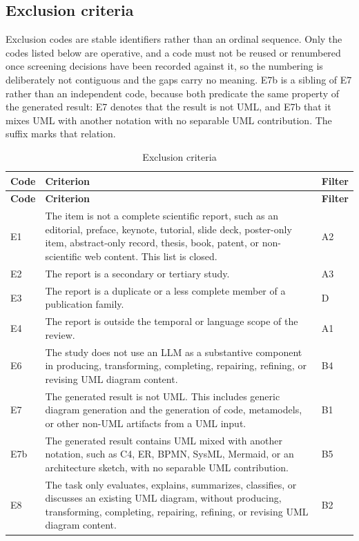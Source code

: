 \subsection{Exclusion criteria}

Exclusion codes are stable identifiers rather than an ordinal sequence. Only the codes listed below are operative, and a code must not be reused or renumbered once screening decisions have been recorded against it, so the numbering is deliberately not contiguous and the gaps carry no meaning. E7b is a sibling of E7 rather than an independent code, because both predicate the same property of the generated result: E7 denotes that the result is not UML, and E7b that it mixes UML with another notation with no separable UML contribution. The suffix marks that relation.

\begin{longtable}{p{} p{} p{}}
\caption{Exclusion criteria}
\label{tab:protocol_exclusion}\\
\toprule
\textbf{Code} & \textbf{Criterion} & \textbf{Filter} \\
\midrule
\endfirsthead
\toprule
\textbf{Code} & \textbf{Criterion} & \textbf{Filter} \\
\midrule
\endhead
E1 & The item is not a complete scientific report, such as an editorial, preface, keynote, tutorial, slide deck, poster-only item, abstract-only record, thesis, book, patent, or non-scientific web content. This list is closed. & A2 \\
E2 & The report is a secondary or tertiary study. & A3 \\
E3 & The report is a duplicate or a less complete member of a publication family. & D \\
E4 & The report is outside the temporal or language scope of the review. & A1 \\
E6 & The study does not use an LLM as a substantive component in producing, transforming, completing, repairing, refining, or revising UML diagram content. & B4 \\
E7 & The generated result is not UML. This includes generic diagram generation and the generation of code, metamodels, or other non-UML artifacts from a UML input. & B1 \\
E7b & The generated result contains UML mixed with another notation, such as C4, ER, BPMN, SysML, Mermaid, or an architecture sketch, with no separable UML contribution. & B5 \\
E8 & The task only evaluates, explains, summarizes, classifies, or discusses an existing UML diagram, without producing, transforming, completing, repairing, refining, or revising UML diagram content. & B2 \\

\end{longtable}
